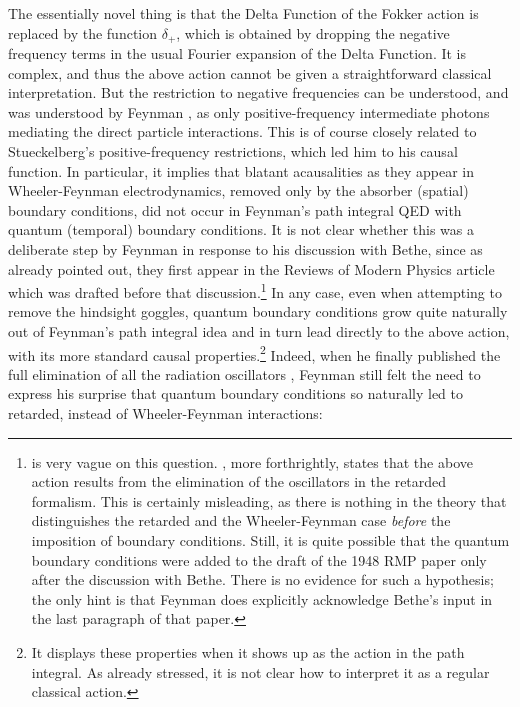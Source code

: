 \documentclass[12pt]{article}
\begin{document}
The essentially novel thing is that the Delta Function of the Fokker action is replaced by the function $\delta_+$, which is obtained by dropping the negative frequency terms in the usual Fourier expansion of the Delta Function. It is complex, and thus the above action cannot be given a straightforward classical interpretation. But the restriction to negative frequencies can be understood, and was understood by Feynman \citep[p.772]{feynman_1949_space-time}, as only positive-frequency intermediate photons mediating the direct particle interactions. This is of course closely related to Stueckelberg's positive-frequency restrictions, which led him to his causal function. In particular, it implies that blatant acausalities as they appear in Wheeler-Feynman electrodynamics, removed only by the absorber (spatial) boundary conditions, did not occur in Feynman's path integral QED with quantum (temporal) boundary conditions. It is not clear whether this was a deliberate step by Feynman in response to his discussion with Bethe, since as already pointed out, they first appear in the Reviews of Modern Physics article which was drafted before that discussion.\footnote{\label{fn:bethe} \citep[p. 231]{mehra_1994_the-beat} is very vague on this question. \citep[p. 479]{schweber_1986_feynman}, more forthrightly, states that the above action results from the elimination of the oscillators in the retarded formalism. This is certainly misleading, as there is nothing in the theory that distinguishes the retarded and the Wheeler-Feynman case \emph{before} the imposition of boundary conditions. Still, it is quite possible that the quantum boundary conditions were added to the draft of the 1948 RMP paper only after the discussion with Bethe. There is no evidence for such a hypothesis; the only hint is that Feynman does explicitly acknowledge Bethe's input in the last paragraph of that paper.} In any case, even when attempting to remove the hindsight goggles, quantum boundary conditions grow quite naturally out of Feynman's path integral idea and in turn lead directly to the above action, with its more standard causal properties.\footnote{It displays these properties when it shows up as the action in the path integral. As already stressed, it is not clear how to interpret it as a regular classical action.} Indeed, when he finally published the full elimination of all the radiation oscillators \citep{feynman_1950_mathematical}, Feynman still felt the need to express his surprise that quantum boundary conditions so naturally led to retarded, instead of Wheeler-Feynman interactions:
\end{document}
